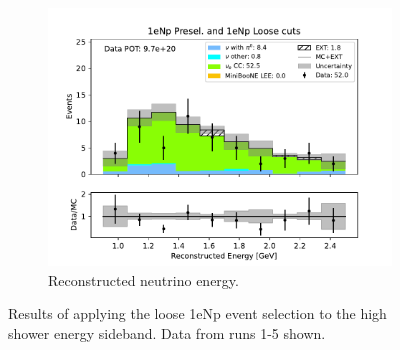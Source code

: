 \begin{figure}[H]
\begin{subfigure}{0.5\linewidth}
        \includegraphics[width=\linewidth]{technote/Sidebands/Figures/ShowerEnergySideband/shr_energy_sideband_reco_e_run1234b4c4d_NP_NPL.pdf}%
        \caption{Reconstructed neutrino energy.}
    \end{subfigure}
    \caption{Results of applying the loose 1eNp event selection to the high shower energy sideband. Data from runs 1-5 shown.}
    \label{fig:ShrEnergySideband1eNpRuns12345}
\end{figure}

